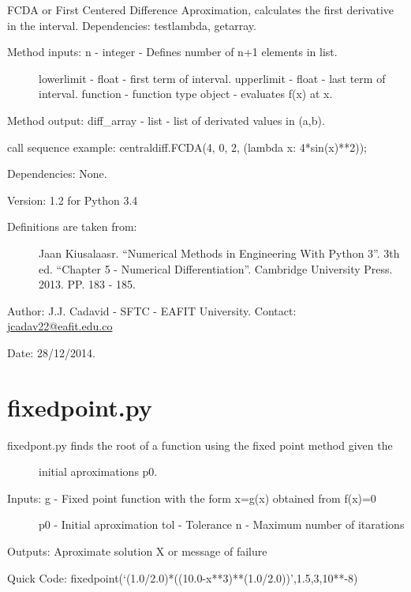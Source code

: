 \documentclass[letterpaper,10pt,oneside]{sphinxmanual}
\theoremstyle{plain}%
\theoremstyle{definition}%
\theoremstyle{remark}%
\begin{document}
FCDA or First Centered Difference Aproximation, calculates the first
derivative in the interval. Dependencies: testlambda, getarray.
\begin{description}
\item[{Method inputs: n - integer - Defines number of n+1 elements in list.}] \leavevmode
lowerlimit - float - first term of interval.
upperlimit - float - last term of interval.
function - function type object - evaluates f(x) at x.

\end{description}

Method output: diff\_array - list - list of derivated values in (a,b).

call sequence example: centraldiff.FCDA(4, 0, 2, (lambda x: 4*sin(x)**2));

Dependencies: None.

Version: 1.2 for Python 3.4
\begin{description}
\item[{Definitions are taken from:}] \leavevmode
Jaan Kiusalaasr. ``Numerical Methods in Engineering With Python 3''.
3th ed. ``Chapter 5 - Numerical Differentiation''. 
Cambridge University Press. 2013. PP. 183 - 185.

\end{description}

Author: J.J. Cadavid - SFTC - EAFIT University.
Contact: \href{mailto:jcadav22@eafit.edu.co}{jcadav22@eafit.edu.co}

Date: 28/12/2014.


\section{fixedpoint.py}
\label{code:module-fixedpoint}\label{code:fixedpoint-py}\begin{description}
\item[{fixedpont.py finds the root of a function using the fixed point method given the}] \leavevmode
initial aproximations p0.

\item[{Inputs: g - Fixed point function with the form x=g(x) obtained from f(x)=0}] \leavevmode
p0 - Initial aproximation
tol - Tolerance
n - Maximum number of itarations

\end{description}

Outputs: Aproximate solution X or message of failure

Quick Code: fixedpoint(`(1.0/2.0)*((10.0-x**3)**(1.0/2.0))',1.5,3,10**-8)
\end{document}
